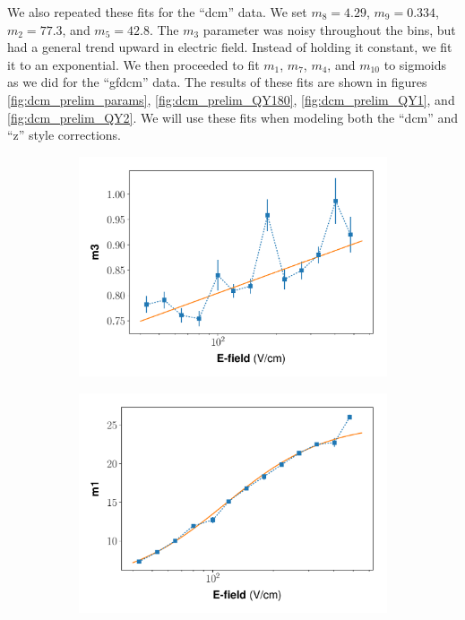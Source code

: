  
 
We also repeated these fits for the ``dcm'' data. We set $m_8=4.29$, $m_9= 0.334$, $m_2=77.3$, and $m_5=42.8$. The $m_3$ parameter was noisy throughout the bins, but had a general trend upward in electric field. Instead of holding it constant, we fit it to an exponential. We then proceeded to fit $m_1$, $m_7$, $m_4$, and $m_{10}$ to sigmoids as we did for the ``gfdcm'' data.  The results of these fits are shown in figures \ref{fig:dcm_prelim_params}, \ref{fig:dcm_prelim_QY180}, \ref{fig:dcm_prelim_QY1}, and \ref{fig:dcm_prelim_QY2}. We will use these fits when modeling both the ``dcm'' and ``z'' style corrections.
\begin{figure}[h!]
\centering
\begin{subfigure}{0.45\textwidth}
  \centering
  \includegraphics[width=\textwidth]{Figures/Yields_fit_old/NEST_m3_fit_old_dcm.pdf}
  \caption{}
\end{subfigure}%
\begin{subfigure}{0.45\textwidth}
  \centering
  \includegraphics[width=\textwidth]{Figures/Yields_fit_old/NEST_m1_fit_old_dcm.pdf}

\end{subfigure}
\end{figure}
